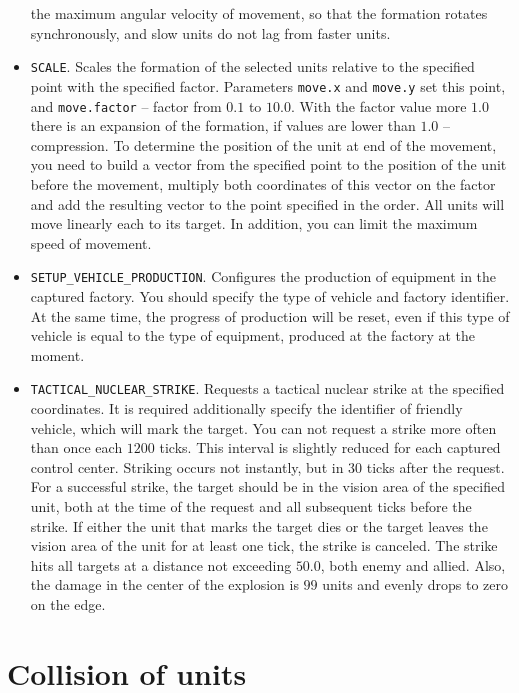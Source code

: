 \begin{itemize}
        the maximum angular velocity of movement, so that the formation rotates synchronously, and slow units do not lag from
        faster units.
    \item \texttt{SCALE}. Scales the formation of the selected units relative to the specified point with the specified factor. Parameters
        \texttt{move.x} and \texttt{move.y} set this point, and \texttt{move.factor} – factor from $0.1$ to $10.0$. With the factor value
        more $1.0$ there is an expansion of the formation, if values are lower than $1.0$ -- compression. To determine the position of the unit at
        end of the movement, you need to build a vector from the specified point to the position of the unit before the movement, multiply both coordinates of this
        vector on the factor and add the resulting vector to the point specified in the order. All units will move linearly each to
        its target. In addition, you can limit the maximum speed of movement.
    \item \texttt{SETUP\_VEHICLE\_PRODUCTION}. Configures the production of equipment in the captured factory. You should specify the type of
        vehicle and factory identifier. At the same time, the progress of production will be reset, even if this type of vehicle is equal to the type of equipment,
        produced at the factory at the moment.
    \item \texttt{TACTICAL\_NUCLEAR\_STRIKE}. Requests a tactical nuclear strike at the specified coordinates. It is required
        additionally specify the identifier of friendly vehicle, which will mark the target. You can not request a strike
        more often than once each $1200$ ticks. This interval is slightly reduced for each captured control center. Striking occurs
        not instantly, but in $30$ ticks after the request. For a successful strike, the target should be in the vision area
        of the specified unit, both at the time of the request and all subsequent ticks before the strike. If either the unit that marks the target dies
        or the target leaves the vision area of the unit for at least one tick, the strike is canceled. The strike hits all targets at a distance
        not exceeding $50.0$, both enemy and allied. Also, the damage in the center of the explosion is $99$ units and evenly drops to
        zero on the edge.
\end{itemize}

\section{Collision of units}

